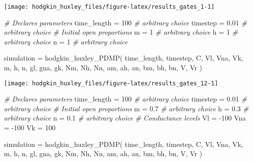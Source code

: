\documentclass[
]{article}
\newenvironment{Shaded}{\begin{snugshade}}{\end{snugshade}}
\newcommand{\CommentTok}[1]{\textcolor[rgb]{0.56,0.35,0.01}{\textit{#1}}}
\newcommand{\DecValTok}[1]{\textcolor[rgb]{0.00,0.00,0.81}{#1}}
\newcommand{\FloatTok}[1]{\textcolor[rgb]{0.00,0.00,0.81}{#1}}
\newcommand{\FunctionTok}[1]{\textcolor[rgb]{0.00,0.00,0.00}{#1}}
\newcommand{\NormalTok}[1]{#1}
\newcommand{\OtherTok}[1]{\textcolor[rgb]{0.56,0.35,0.01}{#1}}
\newcommand{\SpecialCharTok}[1]{\textcolor[rgb]{0.00,0.00,0.00}{#1}}
\begin{document}
\texttt{[image: hodgkin\_huxley\_files/figure-latex/results\_gates\_1-1]}

\begin{Shaded}
\begin{Highlighting}[]
\CommentTok{\# Declares parameters}
\NormalTok{time\_length }\OtherTok{=} \DecValTok{100}     \CommentTok{\# arbitrary choice}
\NormalTok{timestep    }\OtherTok{=} \FloatTok{0.01}    \CommentTok{\# arbitrary choice}
\CommentTok{\# Initial open proportions}
\NormalTok{m           }\OtherTok{=} \DecValTok{1}    \CommentTok{\# arbitrary choice}
\NormalTok{h           }\OtherTok{=} \DecValTok{1}    \CommentTok{\# arbitrary choice}
\NormalTok{n           }\OtherTok{=} \DecValTok{1}    \CommentTok{\# arbitrary choice}

\NormalTok{simulation }\OtherTok{=} \FunctionTok{hodgkin\_huxley\_PDMP}\NormalTok{(}
\NormalTok{  time\_length, timestep,}
\NormalTok{  C, }
\NormalTok{  Vl, Vna, Vk, }
\NormalTok{  m, h, n,}
\NormalTok{  gl, gna, gk,}
\NormalTok{  Nm, Nh, Nn,}
\NormalTok{  am, ah, an, bm, bh, bn,}
\NormalTok{  V, Vr}
\NormalTok{)}
\end{Highlighting}
\end{Shaded}

\texttt{[image: hodgkin\_huxley\_files/figure-latex/results\_gates\_12-1]}

\begin{Shaded}
\begin{Highlighting}[]
\CommentTok{\# Declares parameters}
\NormalTok{time\_length }\OtherTok{=} \DecValTok{100}     \CommentTok{\# arbitrary choice}
\NormalTok{timestep    }\OtherTok{=} \FloatTok{0.01}    \CommentTok{\# arbitrary choice}
\CommentTok{\# Initial open proportions}
\NormalTok{m           }\OtherTok{=} \FloatTok{0.7}     \CommentTok{\# arbitrary choice}
\NormalTok{h           }\OtherTok{=} \FloatTok{0.3}     \CommentTok{\# arbitrary choice}
\NormalTok{n           }\OtherTok{=} \FloatTok{0.1}     \CommentTok{\# arbitrary choice}
\CommentTok{\# Conductance levels}
\NormalTok{Vl          }\OtherTok{=} \SpecialCharTok{{-}}\DecValTok{100}    
\NormalTok{Vna         }\OtherTok{=} \SpecialCharTok{{-}}\DecValTok{100}    
\NormalTok{Vk          }\OtherTok{=} \DecValTok{100}     

\NormalTok{simulation }\OtherTok{=} \FunctionTok{hodgkin\_huxley\_PDMP}\NormalTok{(}
\NormalTok{  time\_length, timestep,}
\NormalTok{  C, }
\NormalTok{  Vl, Vna, Vk, }
\NormalTok{  m, h, n,}
\NormalTok{  gl, gna, gk,}
\NormalTok{  Nm, Nh, Nn,}
\NormalTok{  am, ah, an, bm, bh, bn,}
\NormalTok{  V, Vr}
\NormalTok{)}
\end{Highlighting}
\end{Shaded}
\end{document}
